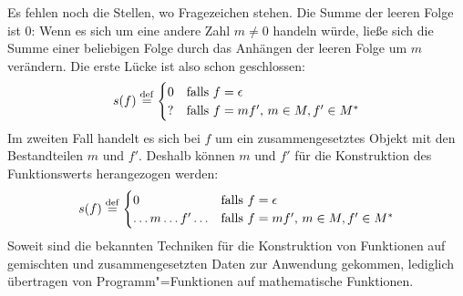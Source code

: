 Es fehlen noch die Stellen, wo Fragezeichen stehen.
Die Summe der leeren Folge ist $0$:  Wenn es sich um eine andere
Zahl $m \neq 0$ handeln würde, ließe sich die Summe einer
beliebigen Folge durch das Anhängen der leeren Folge um $m$ verändern.
Die erste Lücke ist also schon geschlossen:
%
\begin{displaymath}
  s(f) \stackrel{\rm def}{=}
  \begin{cases}
    0 & \textrm{falls $f = \epsilon$}\\
    ? & \textrm{falls $f = mf'$, $m\in M, f'\in M^\ast$}
  \end{cases}
\end{displaymath}
%
Im zweiten Fall handelt es sich bei $f$ um ein
zusammengesetztes Objekt mit den Bestandteilen $m$ und $f'$.
Deshalb können $m$ und $f'$ für die Konstruktion des Funktionswerts
herangezogen werden:
%
\begin{displaymath}
  s(f) \stackrel{\rm def}{=}
  \begin{cases}
    0 & \textrm{falls $f = \epsilon$}\\
    \ldots m \ldots f' \ldots & \textrm{falls $f = mf'$, $m\in M, f'\in M^\ast$}
  \end{cases}
\end{displaymath}
%
Soweit sind die bekannten Techniken für die Konstruktion von
Funktionen auf gemischten und zusammengesetzten Daten zur Anwendung
gekommen, lediglich übertragen von Programm"=Funktionen auf
mathematische Funktionen.

